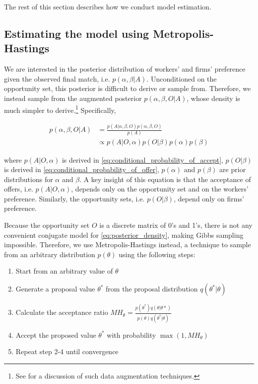The rest of this section describes how we conduct model estimation.

\subsection{Estimating the model using Metropolis-Hastings}

We are interested in the posterior distribution of workers' and firms'
preference given the observed final match, i.e. $p(\alpha, \beta | A)$.
Unconditioned on the opportunity set, this posterior is difficult to derive or
sample from. Therefore, we instead sample from the augmented posterior
$p(\alpha, \beta, O | A)$, whose density is much simpler to derive.\footnote{See
  \citet{Tanner1987} for a discussion of such data augmentation techniques.}
Specifically,

\begin{align}
  p(\alpha, \beta, O | A) &= \frac{p(A | \alpha, \beta, O) p(\alpha, \beta, O)}{p(A)} \\
                          &\propto p(A|O, \alpha) p(O|\beta) p(\alpha) p(\beta) 
                            \label{eq:posterior_density}
\end{align}

where $p(A|O, \alpha)$ is derived in
\eqref{eq:conditional_probability_of_accept}, $p(O|\beta)$ is derived in
\eqref{eq:conditional_probability_of_offer}, $p(\alpha)$ and $p(\beta)$ are
prior distributions for $\alpha$ and $\beta$. A key insight of this equation is
that the acceptance of offers, i.e. $p(A|O, \alpha)$, depends only on the
opportunity set and on the workers' preference. Similarly, the opportunity sets,
i.e. $p(O|\beta)$, depend only on firms' preference.

Because the opportunity set $O$ is a discrete matrix of 0's and 1's, there is
not any convenient conjugate model for \eqref{eq:posterior_density}, making
Gibbs sampling impossible. Therefore, we use Metropolis-Hastings instead, a
technique to sample from an arbitrary distribution $p(\theta)$ using the
following steps:

\begin{enumerate}
\item Start from an arbitrary value of $\theta$
\item Generate a proposal value $\theta^*$ from the proposal distribution
  $q(\theta^*|\theta)$
\item Calculate the acceptance ratio $MH_{\theta} =
  \frac{p(\theta^*)q(\theta|\theta*)}{p(\theta)q(\theta^*|\theta)}$
\item Accept the proposed value $\theta^*$ with probability $\max(1,
  MH_{\theta})$
\item Repeat step 2-4 until convergence
\end{enumerate}

